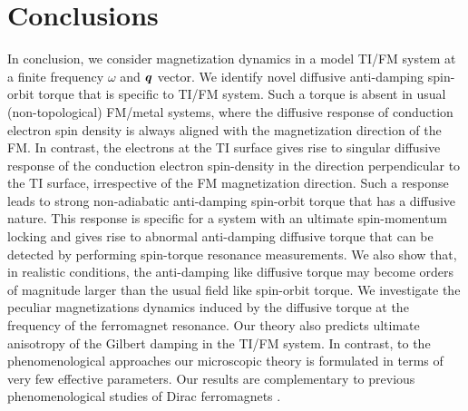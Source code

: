 \section{Conclusions}
In conclusion, we consider magnetization dynamics in a model TI/FM system at a finite frequency $\omega$ and $\boldsymbol{q}$ vector. We identify novel diffusive anti-damping spin-orbit torque that is specific to TI/FM system.  Such a torque is absent in usual (non-topological) FM/metal systems, where the diffusive response of conduction electron spin density is always aligned with the magnetization direction of the FM. In contrast, the electrons at the TI surface gives rise to singular diffusive response of the conduction electron spin-density in the direction perpendicular to the TI surface, irrespective of the FM magnetization direction. Such a response leads to strong non-adiabatic anti-damping spin-orbit torque that has a diffusive nature. This response is specific for a system with an ultimate spin-momentum locking and gives rise to abnormal anti-damping diffusive torque that can be detected by performing spin-torque resonance measurements. We also show that, in realistic conditions, the anti-damping like diffusive torque may become orders of magnitude larger than the usual field like spin-orbit torque. We investigate the peculiar magnetizations dynamics induced by the diffusive torque at the frequency of the ferromagnet resonance. Our theory also predicts ultimate anisotropy of the Gilbert damping in the TI/FM system. In contrast, to the phenomenological approaches \cite{vanderBijl2012,Hals2013} our microscopic theory is formulated in terms of very few effective parameters. Our results are complementary to previous phenomenological studies of Dirac ferromagnets \cite{tserkovnyak_theory_2009,mahfouzi_spin-orbit_2012,katsnelson15,fischer_spin-torque_2016,yokoyama_theoretical_2010,yokoyama_current-induced_2011,siu_spin_2016,mahfouzi_antidamping_2016,soleimani_spin-orbit_2017,kurebayashi_microscopic_2017,chen_current-induced_2017,rodriguez-vega_giant_2016,qi_topological_2008,garate_inverse_2010,yokoyama_theoretical_2010,yokoyama_current-induced_2011,nomura_electric_2010,tserkovnyak_thin-film_2012-1,linder_improved_2014,tserkovnyak_spin_2015,ueda_topological_2012,liu_reading_2013,chang_nonequilibrium_2015,fischer_spin-torque_2016,mahfouzi_antidamping_2016,fujimoto_transport_2014,okuma_unconventional_2016}.

